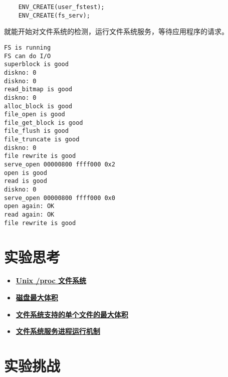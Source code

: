 \begin{verbatim}
    ENV_CREATE(user_fstest);
    ENV_CREATE(fs_serv);
\end{verbatim}

就能开始对文件系统的检测，运行文件系统服务，等待应用程序的请求。

\begin{verbatim}
FS is running
FS can do I/O
superblock is good
diskno: 0
diskno: 0
read_bitmap is good
diskno: 0
alloc_block is good
file_open is good
file_get_block is good
file_flush is good
file_truncate is good
diskno: 0
file rewrite is good
serve_open 00000800 ffff000 0x2
open is good
read is good
diskno: 0
serve_open 00000800 ffff000 0x0
open again: OK
read again: OK
file rewrite is good
\end{verbatim}

\section{实验思考}

\begin{itemize}
\item \hyperref[think-proc]{\textbf{\textcolor{baseB}{Unix /proc 文件系统}}}
\item \hyperref[think-disksize]{\textbf{\textcolor{baseB}{磁盘最大体积}}}
\item \hyperref[think-filesize]{\textbf{\textcolor{baseB}{文件系统支持的单个文件的最大体积}}}
\item \hyperref[think-fs-serve]{\textbf{\textcolor{baseB}{文件系统服务进程运行机制}}}
\end{itemize}

\section{实验挑战}




